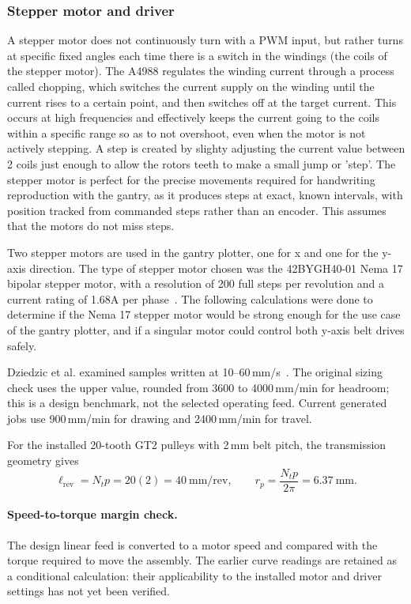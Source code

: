 \subsubsection{Stepper motor and driver}
\label{sec:des-stepper}
A stepper motor does not continuously turn with a PWM input, but rather turns at specific fixed angles each time there is a switch in the windings (the coils of the stepper motor). The A4988 regulates the winding current through a process called chopping, which switches the current supply on the winding until the current rises to a certain point, and then switches off at the target current.  This occurs at high frequencies and effectively keeps the current going to the coils within a specific range so as to not overshoot, even when the motor is not actively stepping. A step is created by slighty adjusting the current value between 2 coils just enough to allow the rotors teeth to make a small jump or 'step'. The stepper motor is perfect for the precise movements required for handwriting reproduction with the gantry, as it produces steps at exact, known intervals, with position tracked from commanded steps rather than an encoder. This assumes that the motors do not miss steps. 

Two stepper motors are used in the gantry plotter, one for x and one for the y-axis direction. The type of stepper motor chosen was the 42BYGH40-01 Nema 17 bipolar stepper motor, with a resolution of 200 full steps per revolution and a current rating of 1.68A per phase~\cite{stepperds}. The following calculations were done to determine if the Nema 17 stepper motor would be strong enough for the use case of the gantry plotter, and if a singular motor could control both y-axis belt drives safely.

Dziedzic et al. examined samples written at 10--60\,mm/s~\cite{dziedzic2026}. The original sizing check uses the upper value, rounded from 3600 to 4000\,mm/min for headroom; this is a design benchmark, not the selected operating feed. Current generated jobs use 900\,mm/min for drawing and 2400\,mm/min for travel.

For the installed 20-tooth GT2 pulleys with 2\,mm belt pitch, the transmission geometry gives~\cite{acarnley2002}
\begin{equation}
\ell_{\mathrm{rev}}=N_t p=20(2)=40\ \mathrm{mm/rev},\qquad
r_p=\frac{N_t p}{2\pi}=6.37\ \mathrm{mm}.
\label{eq:gan-radius}\label{eq:des-pulley}
\end{equation}
\paragraph{Speed-to-torque margin check.}
The design linear feed is converted to a motor speed and compared with the torque required to move the assembly. The earlier curve readings are retained as a conditional calculation: their applicability to the installed motor and driver settings has not yet been verified.

